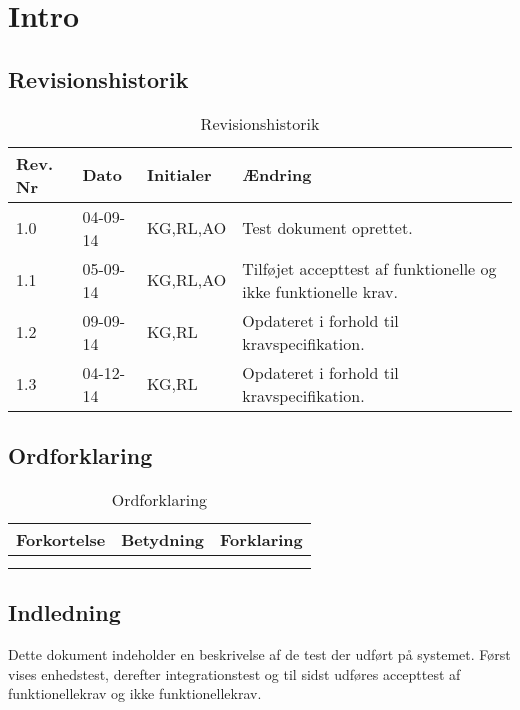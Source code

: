 \chapter{Intro}

\section{Revisionshistorik}

\begin{table}[H]
	\centering
		\begin{tabular}{|p{2 cm}|p{2 cm}|p{3 cm}|p{6 cm}|} 
		\hline
			\textbf{Rev. Nr} & \textbf{Dato}		& \textbf{Initialer} 	& \textbf{Ændring} \\ \hline
			1.0 	& 04-09-14	& KG,RL,AO		& Test dokument oprettet.	\\ \hline
			1.1 	& 05-09-14	& KG,RL,AO		& Tilføjet accepttest af funktionelle \newline og ikke funktionelle krav.\\ \hline
			1.2 	& 09-09-14	& KG,RL			& Opdateret i forhold til \newline kravspecifikation.	\\ \hline
			1.3 	& 04-12-14	& KG,RL			& Opdateret i forhold til \newline kravspecifikation.	\\ \hline
		\end{tabular}
	\caption{Revisionshistorik}
\end{table}

\section{Ordforklaring}


\begin{table}[H]
	\centering
		\begin{tabular}{|p{2.5cm}|p{4.5 cm}|p{6.5 cm}|}  
		\hline
			\textbf{Forkortelse} & \textbf{Betydning} & \textbf{Forklaring} \\ \hline
			& & \\ \hline
			& & \\ \hline
		\end{tabular}
	\caption{Ordforklaring}
\end{table}

\vspace{5cm}

\section{Indledning}
Dette dokument indeholder en beskrivelse af de test der udført på systemet. Først vises enhedstest, derefter integrationstest og til sidst udføres accepttest af funktionellekrav og ikke funktionellekrav.